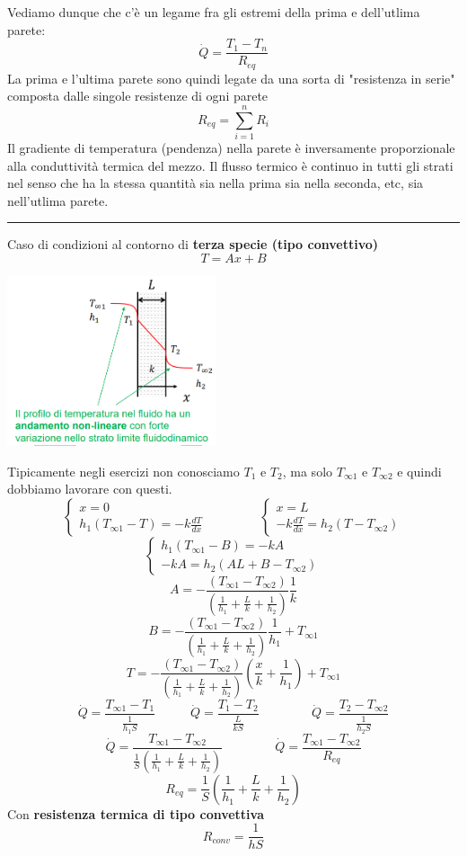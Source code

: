 Vediamo dunque che c'è un legame fra gli estremi della prima e dell'utlima parete:
\[
    \dot{Q} = \frac{T_1-T_n}{R_{eq}}
\]
La prima e l'ultima parete sono quindi legate da una sorta di "resistenza in serie" composta dalle singole resistenze di ogni parete
\[
    R_{eq} = \sum_{i=1}^{n}R_i
\]
Il gradiente di temperatura (pendenza) nella parete è inversamente proporzionale alla conduttività termica del mezzo. Il flusso termico è continuo in tutti gli strati nel senso che ha la stessa quantità sia nella prima sia nella seconda, etc, sia nell'utlima parete.\newline
\newline
\rule{\textwidth}{0,4pt}
Caso di condizioni al contorno di \textbf{terza specie (tipo convettivo)}
\[
    T= Ax + B
\]
\begin{center}
    \includegraphics[height=5cm]{../L10/img4.PNG}
\end{center}
Tipicamente negli esercizi non conosciamo $T_1$ e $T_2$, ma solo $T_{\infty 1}$ e $T_{\infty 2}$ e quindi dobbiamo lavorare con questi.
\[
    \begin{cases}
        x = 0 \\ h_1(T_{\infty 1}-T) = -k \frac{dT}{dx}
    \end{cases} \;\;\;\;\;\;\;\;\;\;\;\;\;\;\; \begin{cases}
        x = L\\ -k \frac{dT}{dx} = h_2(T-T_{\infty 2})
    \end{cases}
\]
\[
    \begin{cases}
        h_1(T_{\infty 1} - B) = -k A \\ -kA = h_2 (AL+B - T_{\infty 2})
    \end{cases}
\]
\[
    A = - \frac{(T_{\infty 1} - T_{\infty 2})}{\left(\frac{1}{h_1} + \frac{L}{k} + \frac{1}{h_2}\right)} \frac{1}{k}
\]
\[
    B = -\frac{(T_{\infty 1} - T_{\infty 2})}{\left(\frac{1}{h_1} + \frac{L}{k} + \frac{1}{h_2}\right)} \frac{1}{h_1} + T_{\infty 1}
\]
\[
    T = - \frac{(T_{\infty 1} - T_{\infty 2})}{\left(\frac{1}{h_1} + \frac{L}{k} + \frac{1}{h_2}\right)}\left(\frac{x}{k} + \frac{1}{h_1}\right) + T_{\infty 1}
\]
\[
    \dot{Q} = \frac{T_{\infty 1}- T_{1}}{\frac{1}{h_1 S}} \;\;\;\;\;\;\;\;\;\; \dot{Q} = \frac{T_1-T_2}{\frac{L}{kS}} \;\;\;\;\;\;\;\;\;\;\;\;\;\;\; \dot{Q} = \frac{T_2-T_{\infty 2}}{\frac{1}{h_2S}}
\]
\[
    \dot{Q} = \frac{T_{\infty 1} - T_{\infty 2}}{\frac{1}{S}\left(\frac{1}{h_1} + \frac{L}{k} + \frac{1}{h_2}\right)} \;\;\;\;\;\;\;\;\;\;\;\;\;\;\; \dot{Q} = \frac{T_{\infty 1} - T_{\infty 2}}{R_{eq}}
\]
\[
    R_{eq} = \frac{1}{S}\left(\frac{1}{h_1} + \frac{L}{k} + \frac{1}{h_2}\right)
\]
Con \textbf{resistenza termica di tipo convettiva}
\[
    R_{conv} = \frac{1}{hS}
\]
